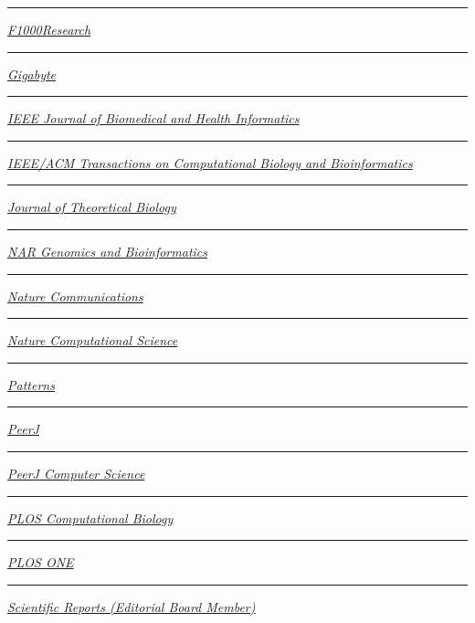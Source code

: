 \documentclass[margin,line]{res}
\begin{document}
\begin{resume}
\rule{-1mm}{5mm} \hspace*{4mm} \href{https://f1000research.com}{\textit{F1000Research}}\\
\rule{-1mm}{5mm} \hspace*{4mm} \href{https://gigabytejournal.com/}{\textit{Gigabyte}}\\
\rule{-1mm}{6mm} \hspace*{4mm} \href{https://ieeexplore.ieee.org/xpl/aboutJournal.jsp?punumber=6221020}{\textit{IEEE Journal of Biomedical and Health Informatics}}\\
\rule{-1mm}{6mm} \hspace*{4mm} \href{https://ieeexplore.ieee.org/xpl/aboutJournal.jsp?punumber=8857}{\textit{IEEE/ACM Transactions on Computational Biology and Bioinformatics}}\\
\rule{-1mm}{5mm} \hspace*{4mm} \href{https://www.sciencedirect.com/journal/journal-of-theoretical-biology}{\textit{Journal of Theoretical Biology}}\\
\rule{-1mm}{5mm} \hspace*{4mm} \href{https://academic.oup.com/nargab}{\textit{NAR Genomics and Bioinformatics}}\\
\rule{-1mm}{5mm} \hspace*{4mm} \href{https://www.nature.com/ncomms}{\textit{Nature Communications}}\\
\rule{-1mm}{5mm} \hspace*{4mm} \href{https://www.nature.com/natcomputsci}{\textit{Nature Computational Science}}\\
\rule{-1mm}{5mm} \hspace*{4mm} \href{https://www.cell.com/patterns}{\textit{Patterns}}\\
\rule{-1mm}{5mm} \hspace*{4mm} \href{https://peerj.com/}{\textit{PeerJ}}\\
\rule{-1mm}{5mm} \hspace*{4mm} \href{https://peerj.com/computer-science/}{\textit{PeerJ Computer Science}}\\
\rule{-1mm}{5mm} \hspace*{4mm} \href{https://journals.plos.org/ploscompbiol/}{\textit{PLOS Computational Biology}}\\
\rule{-1mm}{5mm} \hspace*{4mm} \href{https://journals.plos.org/plosone/}{\textit{PLOS ONE}}\\
\rule{-1mm}{5mm} \hspace*{4mm} \href{https://www.nature.com/srep/}{\textit{Scientific Reports (Editorial Board Member)}}\\

\end{resume}
\end{document}
